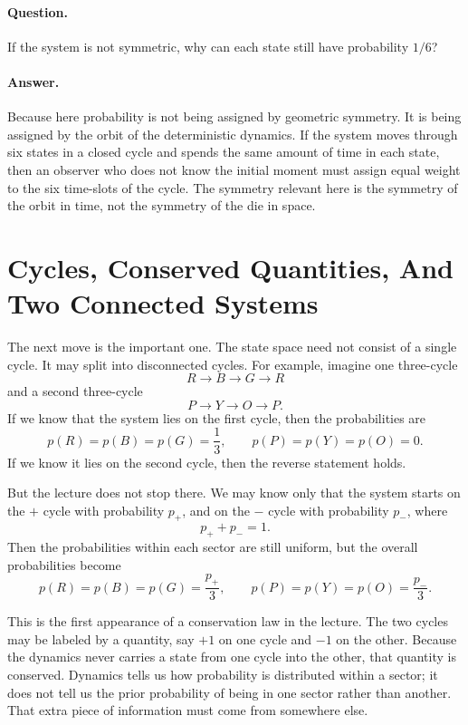 \paragraph{Question.} If the system is not symmetric, why can each state still have probability \(1/6\)?

\paragraph{Answer.} Because here probability is not being assigned by geometric symmetry. It is being assigned by the orbit of the deterministic dynamics. If the system moves through six states in a closed cycle and spends the same amount of time in each state, then an observer who does not know the initial moment must assign equal weight to the six time-slots of the cycle. The symmetry relevant here is the symmetry of the orbit in time, not the symmetry of the die in space.

\section{Cycles, Conserved Quantities, And Two Connected Systems}

The next move is the important one. The state space need not consist of a single cycle. It may split into disconnected cycles. For example, imagine one three-cycle
\[
R \to B \to G \to R
\]
and a second three-cycle
\[
P \to Y \to O \to P.
\]
If we know that the system lies on the first cycle, then the probabilities are
\begin{equation}
p(R)=p(B)=p(G)=\frac13,
\qquad
p(P)=p(Y)=p(O)=0.
\end{equation}
If we know it lies on the second cycle, then the reverse statement holds.

But the lecture does not stop there. We may know only that the system starts on the \(+\) cycle with probability \(p_{+}\), and on the \(-\) cycle with probability \(p_{-}\), where
\begin{equation}
p_{+}+p_{-}=1.
\end{equation}
Then the probabilities within each sector are still uniform, but the overall probabilities become
\begin{equation}
p(R)=p(B)=p(G)=\frac{p_{+}}{3},
\qquad
p(P)=p(Y)=p(O)=\frac{p_{-}}{3}.
\end{equation}

This is the first appearance of a conservation law in the lecture. The two cycles may be labeled by a quantity, say \(+1\) on one cycle and \(-1\) on the other. Because the dynamics never carries a state from one cycle into the other, that quantity is conserved. Dynamics tells us how probability is distributed within a sector; it does not tell us the prior probability of being in one sector rather than another. That extra piece of information must come from somewhere else.

